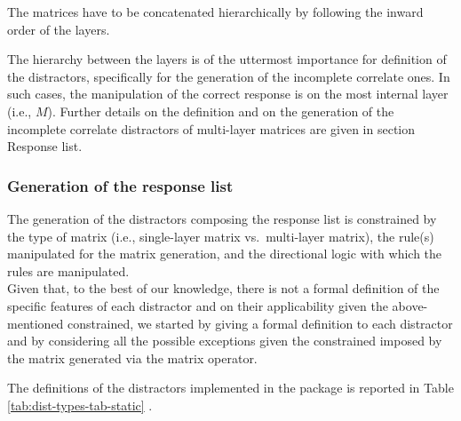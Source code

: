The matrices have to be concatenated hierarchically by following the inward order of the layers.

The hierarchy between the layers is of the uttermost importance for definition of the distractors, specifically for the generation of the incomplete correlate ones. In such cases, the manipulation of the correct response is on the most internal layer (i.e., \(M\)). Further details on the definition and on the generation of the incomplete correlate distractors of multi-layer matrices are given in section Response list.

\hypertarget{generation-of-the-response-list}{%
\subsubsection{Generation of the response list}\label{generation-of-the-response-list}}

The generation of the distractors composing the response list is constrained by the type of matrix (i.e., single-layer matrix vs.~multi-layer matrix), the rule(s) manipulated for the matrix generation, and the directional logic with which the rules are manipulated.\\
Given that, to the best of our knowledge, there is not a formal definition of the specific features of each distractor and on their applicability given the above-mentioned constrained, we started by giving a formal definition to each distractor and by considering all the possible exceptions given the constrained imposed by the matrix generated via the matrix operator.

The definitions of the distractors implemented in the  package is reported in Table \ref{tab:dist-types-tab-static} .


